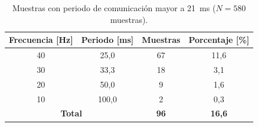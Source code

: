 \begin{table}[htbp]
    \centering
    \caption{Muestras con periodo de comunicación mayor a 21~ms ($N = 580$ muestras).}
    \label{tab:periodo_mayor_21ms}
    \begin{tabular}{cccc}
        \hline
        \textbf{Frecuencia [Hz]} & \textbf{Periodo [ms]} & \textbf{Muestras} & \textbf{Porcentaje [\%]} \\
        \hline
        40 & 25,0  & 67 & 11,6 \\
        30 & 33,3  & 18 & 3,1  \\
        20 & 50,0  & 9  & 1,6  \\
        10 & 100,0 & 2  & 0,3  \\
        \hline
        \multicolumn{2}{c}{\textbf{Total}} & \textbf{96} & \textbf{16,6} \\
        \hline
    \end{tabular}
\end{table}
